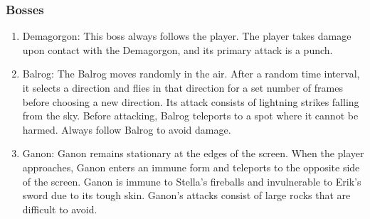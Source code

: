 \subsubsection{Bosses}
\begin{enumerate}[label=\textbullet]
    \item Demagorgon: This boss always follows the player. The player takes damage upon contact with the Demagorgon, and its primary attack is a punch. \cite{demagorgon}
    
    \item Balrog: The Balrog moves randomly in the air. After a random time interval, it selects a direction and flies in that direction for a set number of frames before choosing a new direction. Its attack consists of lightning strikes falling from the sky. Before attacking, Balrog teleports to a spot where it cannot be harmed. Always follow Balrog to avoid damage. \cite{balrog}

    \item Ganon: Ganon remains stationary at the edges of the screen. When the player approaches, Ganon enters an immune form and teleports to the opposite side of the screen. Ganon is immune to Stella’s fireballs and invulnerable to Erik's sword due to its tough skin. Ganon’s attacks consist of large rocks that are difficult to avoid. \cite{ganon}
\end{enumerate}
